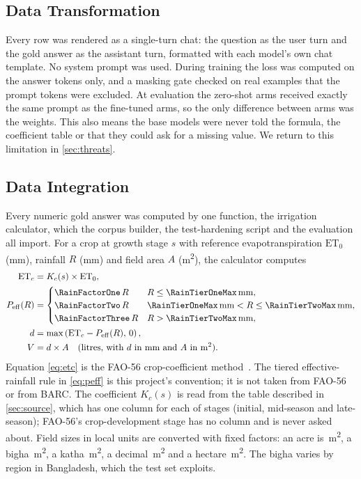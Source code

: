\subsection{Data Transformation}
\label{sec:transformation}

Every row was rendered as a single-turn chat: the question as the user turn and the gold answer as the assistant turn, formatted with each model's own chat template. No system prompt was used. During training the loss was computed on the answer tokens only, and a masking gate checked on \MaskingProbes real examples that the prompt tokens were excluded. At evaluation the zero-shot arms received exactly the same prompt as the fine-tuned arms, so the only difference between arms was the weights. This also means the base models were never told the formula, the coefficient table or that they could ask for a missing value. We return to this limitation in \cref{sec:threats}.

\subsection{Data Integration}
\label{sec:integration}

Every numeric gold answer was computed by one function, the irrigation calculator, which the corpus builder, the test-hardening script and the evaluation all import. For a crop at growth stage $s$ with reference evapotranspiration $\mathrm{ET}_0$ (mm), rainfall $R$ (mm) and field area $A$ (m\textsuperscript{2}), the calculator computes
\begin{align}
  \mathrm{ET}_c &= K_c(s) \times \mathrm{ET}_0, \label{eq:etc}\\
  P_\mathrm{eff}(R) &= \begin{cases}
      \RainFactorOne \, R & R \le \RainTierOneMax\,\text{mm},\\
      \RainFactorTwo \, R & \RainTierOneMax\,\text{mm} < R \le \RainTierTwoMax\,\text{mm},\\
      \RainFactorThree \, R & R > \RainTierTwoMax\,\text{mm},
  \end{cases} \label{eq:peff}\\
  d &= \max\left(\mathrm{ET}_c - P_\mathrm{eff}(R),\, 0\right), \label{eq:net}\\
  V &= d \times A \quad \text{(litres, with $d$ in mm and $A$ in m\textsuperscript{2})}. \label{eq:volume}
\end{align}
Equation \eqref{eq:etc} is the FAO-56 crop-coefficient method~\cite{allen1998fao56}. The tiered effective-rainfall rule in \eqref{eq:peff} is this project's convention; it is not taken from FAO-56 or from BARC. The coefficient $K_c(s)$ is read from the table described in \cref{sec:source}, which has one column for each of \KcStages stages (initial, mid-season and late-season); FAO-56's crop-development stage has no column and is never asked about. Field sizes in local units are converted with fixed factors: an acre is \AreaAcre\,m\textsuperscript{2}, a bigha \AreaBigha\,m\textsuperscript{2}, a katha \AreaKatha\,m\textsuperscript{2}, a decimal \AreaDecimal\,m\textsuperscript{2} and a hectare \AreaHectare\,m\textsuperscript{2}. The bigha varies by region in Bangladesh, which the test set exploits.

